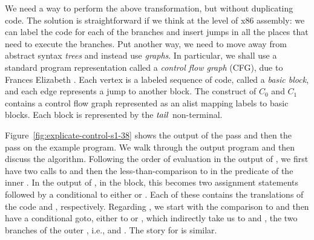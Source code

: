 \documentclass[11pt]{book}
\begin{document}
We need a way to perform the above transformation, but without
duplicating code. The solution is straightforward if we think at the
level of x86 assembly: we can label the code for each of the branches
and insert jumps in all the places that need to execute the
branches. Put another way, we need to move away from abstract syntax
\emph{trees} and instead use \emph{graphs}. In particular, we shall
use a standard program representation called a \emph{control flow
  graph} (CFG), due to Frances Elizabeth \citet{Allen:1970uq}.  Each
vertex is a labeled sequence of code, called a \emph{basic block}, and
each edge represents a jump to another block. The 
construct of $C_0$ and $C_1$ contains a control flow graph represented
as an alist mapping labels to basic blocks. Each block is
represented by the $\mathit{tail}$ non-terminal.

Figure~\ref{fig:explicate-control-s1-38} shows the output of the
 pass and then the
 pass on the example program. We walk through
the output program and then discuss the algorithm.
%
Following the order of evaluation in the output of
, we first have two calls to 
and then the less-than-comparison to  in the predicate of the
inner .  In the output of , in the
 block, this becomes two assignment statements followed by
a conditional  to either  or
. Each of these contains the translations of the code
 and ,
respectively. Regarding , we start with the
comparison to  and then have a conditional
goto, either to  or , which indirectly
take us to  and , the two branches of the
outer , i.e.,  and . The
story for  is similar.
\end{document}
